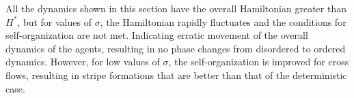 All the dynamics shown in this section have the overall Hamiltonian greater than $H^*$, but for values of $\sigma$, the Hamiltonian rapidly fluctuates and the conditions for self-organization are not met. Indicating erratic movement of the overall dynamics of the agents, resulting in no phase changes from disordered to ordered dynamics. However, for low values of $\sigma$, the self-organization is improved for cross flows, resulting in stripe formations that are better than that of the deterministic case.


